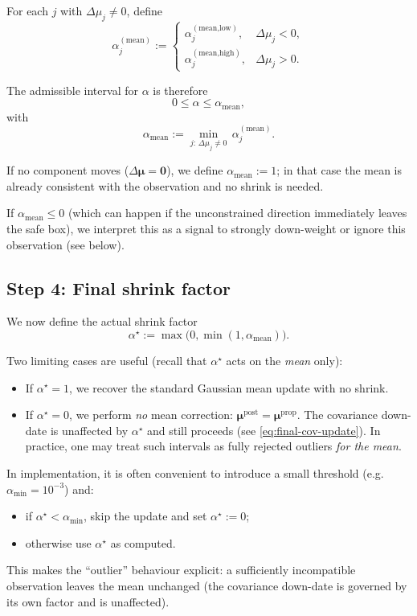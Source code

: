 \documentclass[11pt]{article}
\begin{document}
For each \(j\) with \(\Delta\mu_j\neq 0\), define
\[
  \alpha^{(\text{mean})}_j
  :=
  \begin{cases}
    \alpha^{(\text{mean,low})}_j,  & \Delta\mu_j < 0,\\[4pt]
    \alpha^{(\text{mean,high})}_j, & \Delta\mu_j > 0.
  \end{cases}
\]

The admissible interval for \(\alpha\) is therefore
\[
  0 \le \alpha \le \alpha_{\text{mean}},
\]
with
\[
  \alpha_{\text{mean}}
  :=
  \min_{j:\,\Delta\mu_j\neq 0}\,\alpha^{(\text{mean})}_j.
\]

If no component moves (\(\Delta\boldsymbol{\mu}=\mathbf{0}\)), we define
\(\alpha_{\text{mean}}:=1\); in that case the mean is already consistent with
the observation and no shrink is needed.

If \(\alpha_{\text{mean}}\le 0\) (which can happen if the unconstrained
direction immediately leaves the safe box), we interpret this as a signal to
strongly down-weight or ignore this observation (see below).

\subsection{Step 4: Final shrink factor}

We now define the actual shrink factor
\[
  \alpha^\star
  :=
  \max\bigl(0,\min(1,\alpha_{\text{mean}})\bigr).
\]

Two limiting cases are useful (recall that \(\alpha^\star\) acts on the
\emph{mean} only):
\begin{itemize}
  \item If \(\alpha^\star=1\), we recover the standard Gaussian mean update
        with no shrink.
  \item If \(\alpha^\star=0\), we perform \emph{no} mean correction:
        \(\boldsymbol{\mu}^{\text{post}}=\boldsymbol{\mu}^{\text{prop}}\).
        The covariance down-date is unaffected by \(\alpha^\star\) and still
        proceeds (see \eqref{eq:final-cov-update}). In practice, one may treat
        such intervals as fully rejected outliers \emph{for the mean}.
\end{itemize}

In implementation, it is often convenient to introduce a small threshold
(e.g.\ \(\alpha_{\min}=10^{-3}\)) and:
\begin{itemize}
  \item if \(\alpha^\star < \alpha_{\min}\), skip the update and set
        \(\alpha^\star:=0\);
  \item otherwise use \(\alpha^\star\) as computed.
\end{itemize}
This makes the “outlier” behaviour explicit: a sufficiently incompatible
observation leaves the mean unchanged (the covariance down-date is governed by
its own factor and is unaffected).
\end{document}
